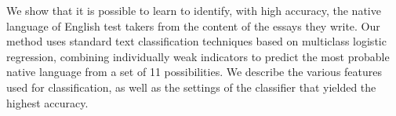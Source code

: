 We show that it is possible to learn to identify, with high accuracy, the native language of English test takers from the content of the essays they
 write.                    Our method uses standard text classification
 techniques based on multiclass logistic regression, combining individually weak
 indicators to predict the most probable native language from a set of 11
 possibilities. We describe the various features used for classification, as
 well as the settings of the classifier that yielded the highest accuracy.

